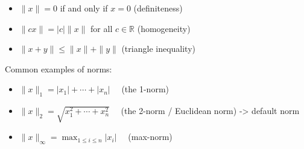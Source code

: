 \documentclass[14pt]{article}
\theoremstyle{definition}
\theoremstyle{remark}
\begin{document}
\begin{multicols}{2}
    \begin{itemize}
        \item $\|x\|=0$ if and only if $x=0$ (definiteness)

        \item $\|c x\|=|c|\|x\|$ for all $c \in \mathbb{R}$ (homogeneity)

        \item $\|x+y\| \leq\|x\|+\|y\|$ (triangle inequality)

    \end{itemize}

    Common examples of norms:

    \begin{itemize}
        \item $\|x\|_{1}=\left|x_{1}\right|+\cdots+\left|x_{n}\right| \quad$ (the 1-norm)

        \item $\|x\|_{2}=\sqrt{x_{1}^{2}+\cdots+x_{n}^{2}} \quad$ (the 2-norm / Euclidean norm)  -> default norm

        \item $\|x\|_{\infty}=\max _{1 \leq i \leq n}\left|x_{i}\right| \quad$ (max-norm)

    \end{itemize}




\end{multicols}

\headrule
\end{document}
